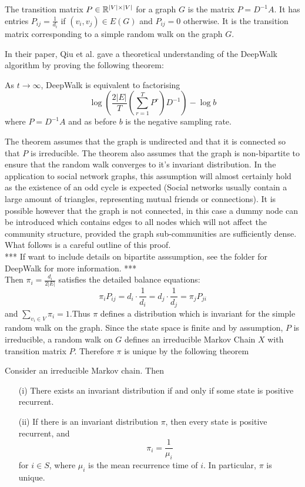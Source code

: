 \documentclass[a4paper]{article}
\begin{document}
\begin{definition}
  The transition matrix $P \in \R^{|V| \times |V|}$ for a graph $G$ is the
  matrix $P = D^{-1}A$. It has entries $P_{ij} = \frac{1}{d_i}$ if $(v_i, v_j)
  \in E(G)$ and $P_{ij} = 0$ otherwise. It is the transition matrix
  corresponding to a simple random walk on the graph $G$. 
\end{definition}

In their paper, Qiu et al. gave a theoretical understanding of the DeepWalk
algorithm by proving the following theorem:

\begin{theorem}
  As $t \to \infty$, DeepWalk is equivalent to factorising
  \[\log{\left(\frac{2|E|}{T}\left( \sum_{r = 1}^T P^r  \right) D^{-1}
      \right)} - \log{b}\]
  where $P = D^{-1}A$ and as before $b$ is the negative sampling rate.
\end{theorem}

The theorem assumes that the graph is undirected and that it is connected so
that $P$ is irreducible. The theorem also assumes that the graph is
non-bipartite to ensure that the random walk converges to it's invariant distribution. In the application to
social network graphs, this
assumption will almost certainly hold as the existence of an odd cycle is
expected (Social networks usually contain a large amount of triangles,
representing mutual friends or connections). It is possible however that the
graph is not connected, in this case a dummy node can be introduced which
contains edges to all nodes which will not affect the community structure,
provided the graph sub-communities are sufficiently dense.
What follows is a careful outline of this proof.\\

*** If want to include details on bipartite asssumption, see the folder for
DeepWalk for more information. ***\\

Then $\pi_i = \frac{d_i}{2|E|}$ satisfies the detailed balance equations:
\[\pi_i P_{ij} = d_i\cdot \frac{1}{d_i} = d_j \cdot \frac{1}{d_j} = \pi_j P_{ji}\]
and $\sum_{v_i \in V} \pi_i = 1$.Thus $\pi$ defines a distribution which is
invariant for the simple random walk on the graph. Since the state space is
finite and by assumption, $P$ is irreducible, a random walk on $G$ defines an
irreducible Markov Chain $X$ with transition matrix $P$. Therefore $\pi$ is
unique by the following theorem
\begin{theorem}
  Consider an irreducible Markov chain. Then
  \begin{itemize}
  \item[(i)] There exists an invariant distribution if and only if some state is
    positive recurrent.
  \item[(ii)] If there is an invariant distribution $\pi$, then every state is
    positive recurrent, and
    \[\pi_i = \frac{1}{\mu_i}\]
    for $i \in S$, where $\mu_i$ is the mean recurrence time of $i$. In
    particular, $\pi$ is unique.
  \end{itemize}
\end{theorem}
\end{document}
